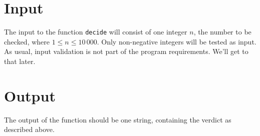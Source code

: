 \section*{Input}
The input to the function \texttt{decide} will consist of one integer $n$,
the number to be checked, where $1 \leq n \leq 10\,000$.
Only non-negative integers will be tested as input.
As usual, input validation is not part of the program requirements.
We'll get to that later.

\section*{Output}
The output of the function should be one string,
containing the verdict as described above.
